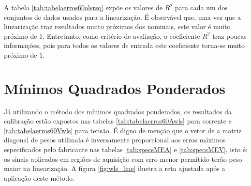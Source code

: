A tabela \ref{tab:tabelaerros60olsrsq} expõe os valores de $R^2$ para cada um dos conjuntos de dados usados para a linearização. É observável que, uma vez que a linearização traz resultados muito próximos dos nominais, este valor é muito próximo de 1. Entretanto, como critério de avaliação, o coeficiente $R^2$ traz poucas informações, pois para todos os valores de entrada este coeficiente torna-se muito próximo de 1.

\begin{table}[htb]
\end{table}


\section{Mínimos Quadrados Ponderados}

Já utilizando o método dos mínimos quadrados ponderados, os resultados da calibração estão expostos nas tabelas \ref{tab:tabelaerros60Awls} para corrente e \ref{tab:tabelaerros60Vwls} para tensão. É digno de menção que o vetor de a matriz diagonal de pesos utilizada é inversamente proporcional aos erros máximos especificados pelo fabricante nas tabelas \ref{tab:specsMEA} e \ref{tab:specsMEV}, isto é: os sinais aplicados em regiões de aquisição com erro menor permitido terão peso maior na linearização. A figura \ref{fig:wls_line} ilustra a reta ajustada após a aplicação deste método.

